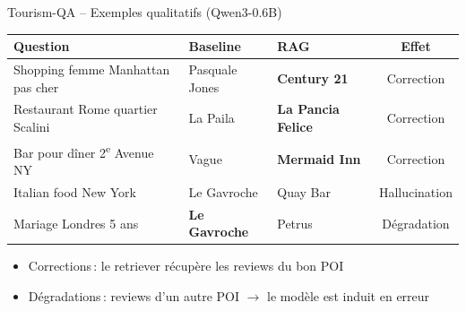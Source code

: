 \documentclass[aspectratio=169, 12pt]{beamer}
\newcommand{\positif}[1]{\textcolor{green!60!black}{#1}}
\newcommand{\negatif}[1]{\textcolor{red!70!black}{#1}}
\begin{document}
\begin{frame}{Tourism-QA -- Exemples qualitatifs (Qwen3-0.6B)}
  \begin{table}
    \centering
    \small
    \begin{tabular}{@{} p{4cm} p{2.5cm} p{2.5cm} c @{}}
      \toprule
      \textbf{Question} & \textbf{Baseline} & \textbf{RAG} & \textbf{Effet} \\
      \midrule
      \rowcolor{green!8}
      Shopping femme Manhattan pas cher & Pasquale Jones & \textbf{Century 21} & \positif{Correction} \\
      \rowcolor{green!8}
      Restaurant Rome quartier Scalini & La Paila & \textbf{La Pancia Felice} & \positif{Correction} \\
      \rowcolor{green!8}
      Bar pour d\^iner 2\textsuperscript{e} Avenue NY & Vague & \textbf{Mermaid Inn} & \positif{Correction} \\
      \midrule
      \rowcolor{red!6}
      Italian food New York & Le Gavroche & Quay Bar & \negatif{Hallucination} \\
      \rowcolor{red!6}
      Mariage Londres 5 ans & \textbf{Le Gavroche} & Petrus & \negatif{D\'egradation} \\
      \bottomrule
    \end{tabular}
  \end{table}

  \vspace{0.2cm}

  \begin{itemize}
    \item \positif{Corrections}\,: le retriever r\'ecup\`ere les reviews du bon POI
    \item \negatif{D\'egradations}\,: reviews d'un autre POI $\to$ le mod\`ele est induit en erreur
  \end{itemize}
\end{frame}
\end{document}
